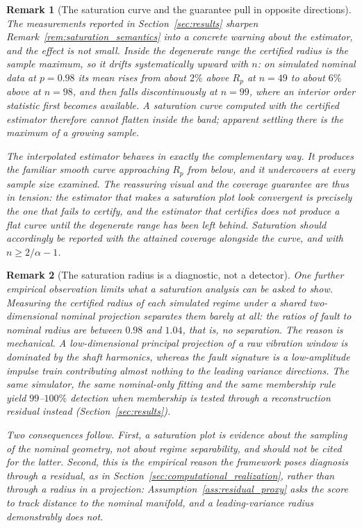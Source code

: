 \documentclass[a4paper]{cas-sc}
\newtheorem{remark}{Remark}
\begin{document}
\begin{remark}[The saturation curve and the guarantee pull in opposite directions]
\label{rem:saturation_tension}
The measurements reported in Section~\ref{sec:results} sharpen
Remark~\ref{rem:saturation_semantics} into a concrete warning about the
estimator, and the effect is not small. Inside the degenerate range the
certified radius \emph{is} the sample maximum, so it drifts systematically
upward with \(n\): on simulated nominal data at \(p=0.98\) its mean rises from
about \(2\%\) above \(R_p\) at \(n=49\) to about \(6\%\) above at \(n=98\), and
then falls discontinuously at \(n=99\), where an interior order statistic first
becomes available. A saturation curve computed with the certified estimator
therefore \emph{cannot} flatten inside the band; apparent settling there is the
maximum of a growing sample.

The interpolated estimator behaves in exactly the complementary way. It
produces the familiar smooth curve approaching \(R_p\) from below, and it
undercovers at every sample size examined. The reassuring visual and the
coverage guarantee are thus in tension: the estimator that makes a saturation
plot look convergent is precisely the one that fails to certify, and the
estimator that certifies does not produce a flat curve until the degenerate
range has been left behind. Saturation should accordingly be reported with the
attained coverage alongside the curve, and with \(n\ge 2/\alpha-1\).
\end{remark}

\begin{remark}[The saturation radius is a diagnostic, not a detector]
\label{rem:radius_not_detector}
One further empirical observation limits what a saturation analysis can be
asked to show. Measuring the certified radius of each simulated regime under a
shared two-dimensional nominal projection separates them barely at all: the
ratios of fault to nominal radius are between \(0.98\) and \(1.04\), that is, no
separation. The reason is mechanical. A low-dimensional principal projection of
a raw vibration window is dominated by the shaft harmonics, whereas the fault
signature is a low-amplitude impulse train contributing almost nothing to the
leading variance directions. The same simulator, the same nominal-only fitting
and the same membership rule yield \(99\)--\(100\%\) detection when membership
is tested through a reconstruction residual instead
(Section~\ref{sec:results}).

Two consequences follow. First, a saturation plot is evidence about the
sampling of the nominal geometry, not about regime separability, and should not
be cited for the latter. Second, this is the empirical reason the framework
poses diagnosis through a residual, as in
Section~\ref{sec:computational_realization}, rather than through a radius in a
projection: Assumption~\ref{ass:residual_proxy} asks the score to track
distance to the nominal manifold, and a leading-variance radius demonstrably
does not.
\end{remark}
\end{document}
